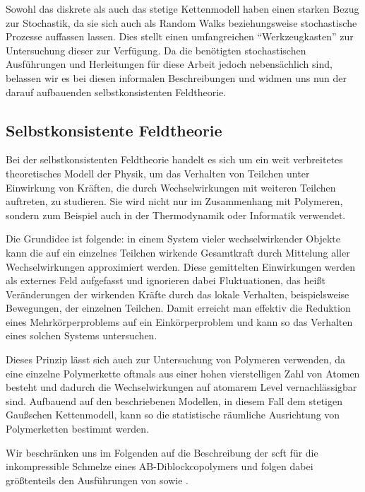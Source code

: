 \documentclass[../main.tex]{subfiles}
\begin{document}
Sowohl das diskrete als auch das stetige Kettenmodell haben einen starken Bezug zur Stochastik, da sie sich auch als Random Walks beziehungsweise stochastische Prozesse auffassen lassen.
Dies stellt einen umfangreichen \enquote{Werkzeugkasten} zur Untersuchung dieser zur Verfügung.
Da die benötigten stochastischen Ausführungen und Herleitungen für diese Arbeit jedoch nebensächlich sind, belassen wir es bei diesen informalen Beschreibungen und widmen uns nun der darauf aufbauenden selbstkonsistenten Feldtheorie.


\subsection*{Selbstkonsistente Feldtheorie} %

Bei der selbstkonsistenten Feldtheorie handelt es sich um ein weit verbreitetes theoretisches Modell der Physik, um das Verhalten von Teilchen unter Einwirkung von Kräften, die durch Wechselwirkungen mit weiteren Teilchen auftreten, zu studieren.
Sie wird nicht nur im Zusammenhang mit Polymeren, sondern zum Beispiel auch in der Thermodynamik oder Informatik verwendet.

Die Grundidee ist folgende: in einem System vieler wechselwirkender Objekte kann die auf ein einzelnes Teilchen wirkende Gesamtkraft durch Mittelung aller Wechselwirkungen approximiert werden.
Diese gemittelten Einwirkungen werden als externes Feld aufgefasst und ignorieren dabei Fluktuationen, das heißt Veränderungen der wirkenden Kräfte durch das lokale Verhalten, beispielsweise Bewegungen, der einzelnen Teilchen.
Damit erreicht man effektiv die Reduktion eines Mehrkörperproblems auf ein Einkörperproblem und kann so das Verhalten eines solchen Systems untersuchen.

Dieses Prinzip lässt sich auch zur Untersuchung von Polymeren verwenden, da eine einzelne Polymerkette oftmals aus einer hohen vierstelligen Zahl von Atomen besteht und dadurch die Wechselwirkungen auf atomarem Level vernachlässigbar sind.
Aufbauend auf den beschriebenen Modellen, in diesem Fall dem stetigen Gaußschen Kettenmodell, kann so die statistische räumliche Ausrichtung von Polymerketten bestimmt werden.

Wir beschränken uns im Folgenden auf die Beschreibung der \ac{scft} für die inkompressible Schmelze eines AB-Diblockcopolymers und folgen dabei größtenteils den Ausführungen von \textcite{Matsen:1994bz} sowie \textcite{Stasiak:2011ba}.
\end{document}
